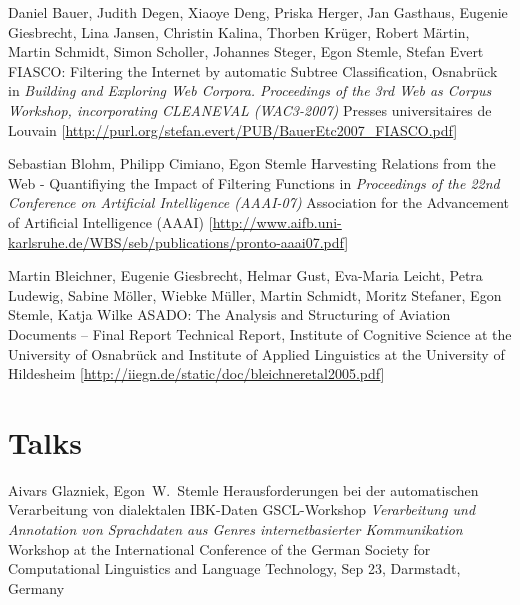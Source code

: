\documentclass[11pt,a4paper]{moderncv}
\begin{document}
        {Daniel Bauer, Judith Degen, Xiaoye Deng, Priska Herger, Jan Gasthaus,
        Eugenie Giesbrecht, Lina Jansen, Christin Kalina, Thorben Kr{\"u}ger,
        Robert M{\"a}rtin, Martin Schmidt, Simon Scholler, Johannes Steger,
        Egon Stemle, Stefan Evert}
        {FIASCO: Filtering the Internet by automatic Subtree Classification,
        Osnabr{\"u}ck}
        {\small in {\em Building and Exploring Web Corpora. Proceedings of the
        3rd Web as Corpus Workshop, incorporating CLEANEVAL (WAC3-2007)}}
        {\small Presses universitaires de Louvain}
        {[\url{http://purl.org/stefan.evert/PUB/BauerEtc2007_FIASCO.pdf}]}
    
        {Sebastian Blohm, Philipp Cimiano, Egon Stemle}
        {Harvesting Relations from the Web - Quantifiying the Impact of
        Filtering Functions}
        {\small in {\em Proceedings of the 22nd Conference on Artificial
        Intelligence (AAAI-07)}}
        {\small Association for the Advancement of Artificial Intelligence
        (AAAI)}
        {[\url{http://www.aifb.uni-karlsruhe.de/WBS/seb/publications/pronto-aaai07.pdf}]}

        {Martin Bleichner, Eugenie Giesbrecht, Helmar Gust, Eva-Maria Leicht,
        Petra Ludewig, Sabine M{\"o}ller, Wiebke M{\"u}ller, Martin Schmidt,
        Moritz Stefaner, Egon Stemle, Katja Wilke}
        {ASADO: The Analysis and Structuring of Aviation Documents -- Final Report}
        {\small Technical Report, Institute of Cognitive Science at the
        University of Osnabr{\"u}ck and Institute of Applied Linguistics at the
        University of Hildesheim}
        {}
        {[\url{http://iiegn.de/static/doc/bleichneretal2005.pdf}]}

\closesection{}

\pagebreak
\section{Talks}
        {Aivars Glazniek, Egon~W.~Stemle}
        {\small Herausforderungen bei der automatischen Verarbeitung von dialektalen IBK-Daten}
        {\small GSCL-Workshop \emph{Verarbeitung und Annotation von Sprachdaten aus
        Genres internetbasierter Kommunikation}}
        {\small Workshop at the International Conference of the German Society
        for Computational Linguistics and Language Technology, Sep 23,
        Darmstadt, Germany}
        {}
\end{document}
